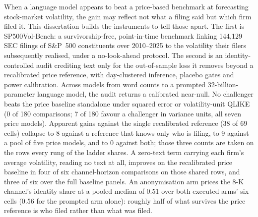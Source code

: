 When a language model appears to beat a price-based benchmark at forecasting stock-market volatility, the gain may reflect not what a filing said but which firm filed it. This dissertation builds the instruments to tell those apart. The first is \mbox{SP500Vol-Bench}: a survivorship-free, point-in-time benchmark linking 144{,}129 SEC filings of S\&P~500 constituents over 2010--2025 to the volatility their filers subsequently realised, under a no-look-ahead protocol. %
The second is an identity-controlled audit crediting text only for the out-of-sample loss it removes beyond a recalibrated price reference, with day-clustered inference, placebo gates and power calibration. Across models from word counts to a prompted 32-billion-parameter language model, the audit returns a calibrated near-null. No challenger beats the price baseline standalone under squared error or volatility-unit QLIKE (0 of 180 comparisons; 7 of 180 favour a challenger in variance units, all seven price models). %
Apparent gains against the single recalibrated reference (38 of 69 cells) collapse to 8 against a reference that knows only who is filing, to 9 against a pool of five price models, and to 0 against both; those three counts are taken on the rows every rung of the ladder shares. %
A zero-text term carrying each firm's average volatility, reading no text at all, improves on the recalibrated price baseline in four of six channel-horizon comparisons on those shared rows, and three of six over the full baseline panels. %
An anonymisation arm prices the 8-K channel's identity share at a pooled median of 0.51 over both executed arms' six cells (0.56 for the prompted arm alone): roughly half of what survives the price reference is who filed rather than what was filed. %

